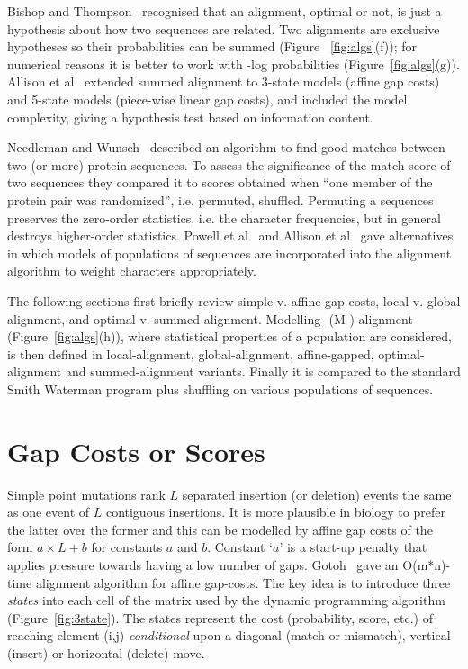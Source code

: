 \documentclass[letterpaper,11pt,oneside]{article}
\begin{document}
Bishop and Thompson~\cite{bishop86} recognised that an alignment, optimal or not,
is just a hypothesis about how two sequences are related.
Two alignments are exclusive hypotheses so their probabilities
can be summed (Figure ~\ref{fig:algs}(f));
for numerical reasons it is better to work with -log probabilities (Figure~\ref{fig:algs}(g)).
Allison et al~\cite{allison92a} extended summed alignment to
3-state models (affine gap costs) and
5-state models (piece-wise linear gap costs),
and included the model complexity,
giving a hypothesis test based on information content.

Needleman and Wunsch~\cite{needleman70} described an algorithm to find good matches between
two (or more) protein sequences.
To assess the significance of the match score of two sequences
they compared it to scores obtained
when ``one member of the protein pair was randomized'', i.e. permuted, shuffled.
Permuting a sequences preserves the zero-order statistics,
i.e. the character frequencies, but
in general destroys higher-order statistics.
Powell et al~\cite{powell98b} and Allison et al~\cite{allison99} gave alternatives in which models
of populations of sequences are incorporated into the alignment algorithm
to weight characters appropriately.

The following sections first briefly review
simple v. affine gap-costs,
local v. global alignment, and
optimal v. summed alignment.
Modelling- (M-) alignment (Figure~\ref{fig:algs}(h)), where statistical properties of a
population are considered, is then defined in
local-alignment, global-alignment, affine-gapped, optimal-alignment and summed-alignment variants.
Finally it is compared to the standard Smith Waterman program plus shuffling
on various populations of sequences.



\section{Gap Costs or Scores}

Simple point mutations rank $L$ separated insertion (or deletion) events
the same as one event of $L$ contiguous insertions.
It is more plausible in biology to prefer the latter over the former and
this can be modelled by affine gap costs of the form $a \times L+b$ for
constants $a$ and $b$.
Constant `$a$' is a start-up penalty that applies pressure towards having
a low number of gaps.
Gotoh~\cite{gotoh82} gave an O(m*n)-time alignment algorithm for affine gap-costs.
The key idea is to introduce three {\em states} into  each cell of
the matrix used by the dynamic programming algorithm (Figure~\ref{fig:3state}).
The states represent the cost (probability, score, etc.) of reaching
element (i,j) {\em conditional} upon a
diagonal (match or mismatch), vertical (insert) or horizontal (delete) move.
\end{document}

